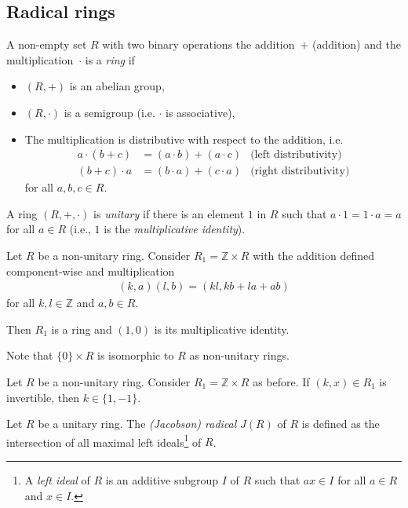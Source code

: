 \subsection{Radical rings}
    \begin{definition}
         A non-empty set $R$ with two binary operations the addition~$+$ (addition) and the multiplication~$\cdot$ is a \emph{ring} if
    \begin{itemize}
        \item $(R,+)$ is an abelian group,
        \item $(R,\cdot)$ is a semigroup (i.e. $\cdot$ is associative),
        \item The multiplication is distributive with respect to the addition, i.e.
        \begin{align*}
            a\cdot (b+c)&=(a\cdot b)+(a\cdot c)&\text{(left distributivity)}\\
            (b+c)\cdot a&=(b\cdot a)+(c\cdot a)&\text{(right distributivity)}
        \end{align*}
        for all $a,b,c\in R$.
    \end{itemize}
    A ring $(R,+,\cdot)$ is \emph{unitary} if there is an element $1$ in $R$ such that $a\cdot 1= 1\cdot a=a$ for all $a \in R$ (i.e., $1$ is the \emph{multiplicative identity}).
    \end{definition}

    Let $R$ be a non-unitary ring. Consider $R_1 = \mathbb{Z}\times R$ with the addition defined component-wise and multiplication
    \begin{align*}
        (k,a)(l,b)=(kl,kb+la+ab)
    \end{align*}
    for all $k,l\in \mathbb{Z}$ and $a,b\in R$.
    
    Then $R_1$ is a ring and $(1, 0)$ is its multiplicative identity.
    
    Note that $\{0\}\times R$ is isomorphic to $R$ as non-unitary rings.

    \begin{exercise}\label{ex:invertible elements}
         Let $R$ be a non-unitary ring. Consider $R_1 = \mathbb{Z}\times R$ as before. If $(k,x)\in R_1$ is invertible, then $k \in\{1,-1\}$.
    \end{exercise}

   \begin{definition}
        Let $R$ be a unitary ring.  The \emph{(Jacobson) radical} $J(R)$ of $R$ is defined as the intersection of all maximal left ideals\footnote{A \emph{left ideal} of $R$ is an additive subgroup $I$ of $R$ such that $ax\in I$ for all $a\in R$ and $x\in I$.} of $R$.
   \end{definition}

